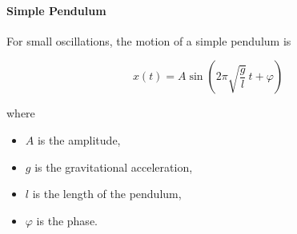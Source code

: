 \paragraph{Simple Pendulum}


For small oscillations, the motion of a simple pendulum is

\begin{equation}
x(t)=A\sin\left(2\pi\sqrt{\frac{g}{l}}\,t+\varphi\right)
\end{equation}

where

\begin{itemize}
    \item $A$ is the amplitude,
    \item $g$ is the gravitational acceleration,
    \item $l$ is the length of the pendulum,
    \item $\varphi$ is the phase.
\end{itemize}


